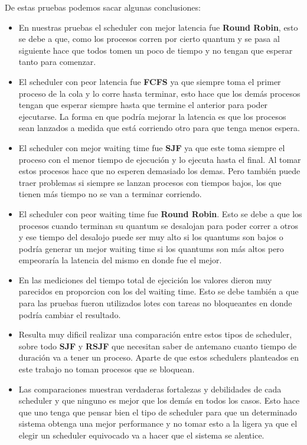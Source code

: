 De estas pruebas podemos sacar algunas conclusiones:

\begin{itemize}

\item En nuestras pruebas el scheduler con mejor latencia fue \textbf{Round Robin}, esto se debe a que, como los procesos corren por cierto quantum y se pasa al siguiente hace que todos tomen un poco de tiempo y no tengan que esperar tanto para comenzar.

\item El scheduler con peor latencia fue \textbf{FCFS} ya que siempre toma el primer proceso de la cola y lo corre hasta terminar, esto hace que los demás procesos tengan que esperar siempre hasta que termine el anterior para poder ejecutarse. La forma en que podría mejorar la latencia es que los procesos sean lanzados a medida que está corriendo otro para que tenga menos espera.

\item El scheduler con mejor waiting time fue \textbf{SJF} ya que este toma siempre el proceso con el menor tiempo de ejecución y lo ejecuta hasta el final. Al tomar estos procesos hace que no esperen demasiado los demas. Pero también puede traer problemas si siempre se lanzan procesos con tiempos bajos, los que tienen más tiempo no se van a terminar corriendo.

\item El scheduler con peor waiting time fue \textbf{Round Robin}. Esto se debe a que los procesos cuando terminan su quantum se desalojan para poder correr a otros y ese tiempo del desalojo puede ser muy alto si los quantums son bajos o podría generar un mejor waiting time si los quantums son más altos pero empeoraría la latencia del mismo en donde fue el mejor.

\item En las mediciones del tiempo total de ejecición los valores dieron muy parecidos en proporcion con los del waiting time. Esto se debe también a que para las pruebas fueron utilizados lotes con tareas no bloqueantes en donde podría cambiar el resultado.

\item Resulta muy dificil realizar una comparación entre estos tipos de scheduler, sobre todo \textbf{SJF} y \textbf{RSJF} que necesitan saber de antemano cuanto tiempo de duración va a tener un proceso. Aparte de que estos schedulers planteados en este trabajo no toman procesos que se bloquean.

\item Las comparaciones muestran verdaderas fortalezas y debilidades de cada scheduler y que ninguno es mejor que los demás en todos los casos. Esto hace que uno tenga que pensar bien el tipo de scheduler para que un determinado sistema obtenga una mejor performance y no tomar esto a la ligera ya que el elegir un scheduler equivocado va a hacer que el sistema se alentice.

\end{itemize}
